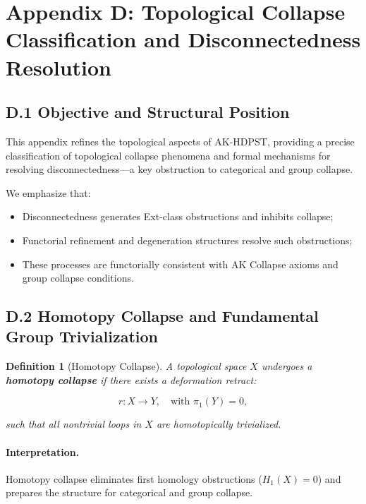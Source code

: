 \documentclass[11pt]{article}
\newtheorem{definition}[theorem]{Definition}
\begin{document}
\section*{Appendix D: Topological Collapse Classification and Disconnectedness Resolution}

\subsection*{D.1 Objective and Structural Position}

This appendix refines the topological aspects of AK-HDPST, providing a precise classification of topological collapse phenomena and formal mechanisms for resolving disconnectedness—a key obstruction to categorical and group collapse.

We emphasize that:

\begin{itemize}
    \item Disconnectedness generates Ext-class obstructions and inhibits collapse;
    \item Functorial refinement and degeneration structures resolve such obstructions;
    \item These processes are functorially consistent with AK Collapse axioms and group collapse conditions.
\end{itemize}

\subsection*{D.2 Homotopy Collapse and Fundamental Group Trivialization}

\begin{definition}[Homotopy Collapse]
A topological space \( X \) undergoes a \textbf{homotopy collapse} if there exists a deformation retract:

\[
r: X \to Y, \quad \text{with } \pi_1(Y) = 0,
\]

such that all nontrivial loops in \( X \) are homotopically trivialized.
\end{definition}

\paragraph{Interpretation.}
Homotopy collapse eliminates first homology obstructions (\( H_1(X) = 0 \)) and prepares the structure for categorical and group collapse.
\end{document}

